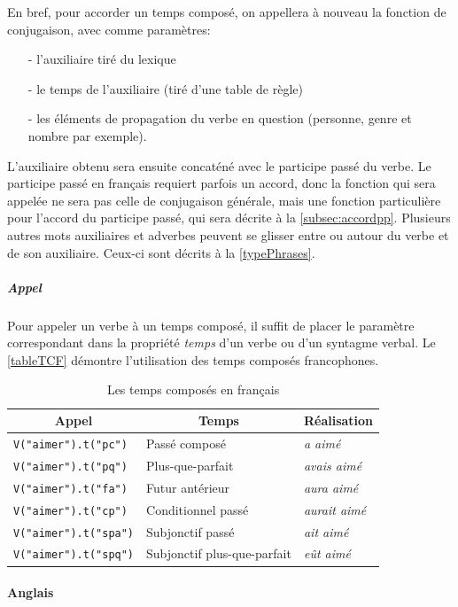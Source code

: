 \documentclass[11pt]{article} %
\newcommand{\real}[1]{\emph{#1}}
\begin{document}
En bref, pour accorder un temps
composé, on appellera à nouveau la fonction de conjugaison, avec comme
paramètres:
\begin{itemize}
\item[-] l'auxiliaire tiré du lexique
\item[-] le temps de l'auxiliaire (tiré d'une table de règle)
\item[-] les éléments de propagation du verbe en question (personne, genre et nombre par exemple).
\end{itemize}
L'auxiliaire obtenu
sera ensuite concaténé avec le participe passé du verbe. Le participe passé 
en français requiert
parfois un accord, donc la fonction qui sera appelée ne sera pas celle
de conjugaison générale, mais une fonction particulière pour l'accord du
participe passé, qui sera décrite à la \autoref{subsec:accordpp}. Plusieurs
autres mots auxiliaires et adverbes peuvent se glisser entre ou autour
du verbe et de son auxiliaire. Ceux-ci sont décrits à la \autoref{typePhrases}.

\subparagraph{Appel}
Pour appeler un verbe à un temps composé, il suffit de placer le paramètre correspondant dans la propriété \emph{temps} d'un verbe ou d'un syntagme verbal. Le \autoref{tableTCF} démontre l'utilisation des temps composés francophones.

\begin{table}[ht]
\caption{Les temps composés en français}
\centering
\begin{tabular}{|l|l|l|}
\hline
\multicolumn{1}{|c}{Appel} & \multicolumn{1}{|c}{Temps} & \multicolumn{1}{|c|}{Réalisation} \\
\hline
\hline
\texttt{V("aimer").t("pc")} & Passé composé & \real{a aimé} \\
\hline
\texttt{V("aimer").t("pq")} & Plus-que-parfait & \real{avais aimé} \\
\hline
\texttt{V("aimer").t("fa")} & Futur antérieur & \real{aura aimé} \\
\hline
\texttt{V("aimer").t("cp")} & Conditionnel passé & \real{aurait aimé} \\
\hline
\texttt{V("aimer").t("spa")} & Subjonctif passé & \real{ait aimé} \\
\hline
\texttt{V("aimer").t("spq")} & Subjonctif plus-que-parfait & \real{eût aimé} \\
\hline
\end{tabular}
\label{tableTCF}
\end{table}

\paragraph{Anglais}
\end{document}
